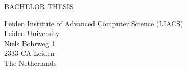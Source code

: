 \documentclass[12pt]{article}
\begin{document}
\begin{large}
\begin{Large}
\end{Large}

\vspace*{3.5cm}

\hspace*{2.5cm}BACHELOR THESIS

\vspace*{1mm}

\hspace*{2.5cm}Leiden Institute of Advanced Computer Science (LIACS)\\
\hspace*{2.5cm}Leiden University\\
\hspace*{2.5cm}Niels Bohrweg 1\\
\hspace*{2.5cm}2333 CA Leiden\\
\hspace*{2.5cm}The Netherlands\\
\hspace*{2.5mm}\ 

\end{large}
\end{document}
